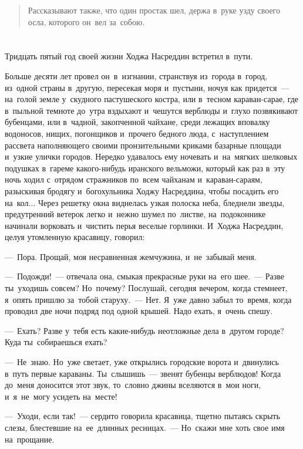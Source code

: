 \documentclass[12pt,a4paper]{book}
\begin{document}
\begin{quote}
Рассказывают также, что один простак шел, держа в~руке узду своего осла, которого он~вел за~собою.
\end{quote}

\chapter{}

Тридцать пятый год своей жизни Ходжа Насреддин встретил в~пути.

Больше десяти лет провел он~в~изгнании, странствуя из~города в~город, из~одной страны в~другую, пересекая моря и~пустыни, ночуя как придется~— на~голой земле у~скудного пастушеского костра, или в~тесном караван-сарае, где в~пыльной темноте до~утра вздыхают и~чешутся верблюды и~глухо позвякивают бубенцами, или в~чадной, закопченной чайхане, среди лежащих вповалку водоносов, нищих, погонщиков и~прочего бедного люда, с~наступлением рассвета наполняющего своими пронзительными криками базарные площади и~узкие улички городов. Нередко удавалось ему ночевать и~на~мягких шелковых подушках в~гареме какого-нибудь иранского вельможи, который как раз в~эту ночь ходил с~отрядом стражников по~всем чайханам и~караван-сараям, разыскивая бродягу и~богохульника Ходжу Насреддина, чтобы посадить его на~кол... Через решетку окна виднелась узкая полоска неба, бледнели звезды, предутренний ветерок легко и~нежно шумел по~листве, на~подоконнике начинали ворковать и~чистить перья веселые горлинки. И~Ходжа Насреддин, целуя утомленную красавицу, говорил:

—~Пора. Прощай, моя несравненная жемчужина, и~не~забывай меня.

—~Подожди!~— отвечала она, смыкая прекрасные руки на~его шее.~— Разве ты~уходишь совсем? Но~почему? Послушай, сегодня вечером, когда стемнеет, я~опять пришлю за~тобой старуху.~— Нет. Я~уже давно забыл то~время, когда проводил две ночи подряд под одной крышей. Надо ехать, я~очень спешу.

—~Ехать? Разве у~тебя есть какие-нибудь неотложные дела в~другом городе? Куда ты~собираешься ехать?

—~Не~знаю. Но~уже светает, уже открылись городские ворота и~двинулись в~путь первые караваны. Ты~слышишь~— звенят бубенцы верблюдов! Когда до~меня доносится этот звук, то~словно джины вселяются в~мои ноги, и~я~не~могу усидеть на~месте!

—~Уходи, если так!~— сердито говорила красавица, тщетно пытаясь скрыть слезы, блестевшие на~ее~длинных ресницах.~— Но~скажи мне хоть свое имя на~прощание.
\end{document}
